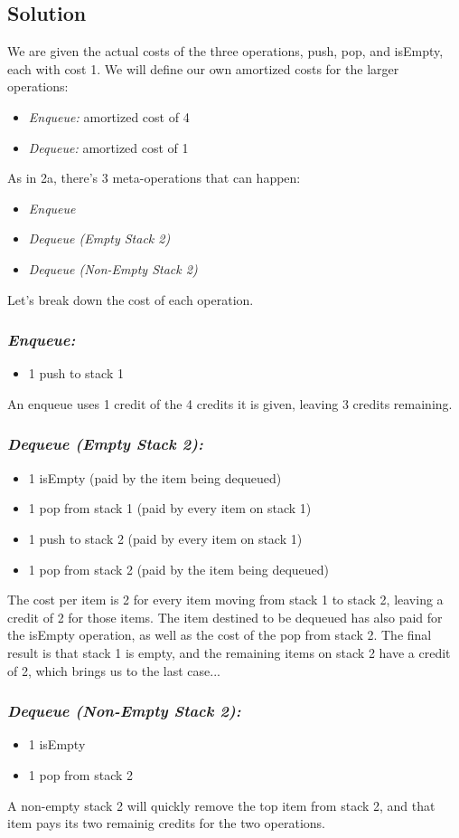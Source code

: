 \subsection*{Solution}

We are given the actual costs of the three operations, push, pop, and isEmpty, each with cost 1. We will define our own amortized costs for the larger operations: 
\begin{itemize}
\item {\em Enqueue:} amortized cost of 4
\item {\em Dequeue:} amortized cost of 1
\end{itemize}

As in 2a, there's 3 meta-operations that can happen:
\begin{itemize}
\item {\em Enqueue} 
\item {\em Dequeue (Empty Stack 2)} 
\item {\em Dequeue (Non-Empty Stack 2)} 
\end{itemize}

Let's break down the cost of each operation.

\subsubsection*{\em Enqueue:} 
\begin{itemize}
\item 1 push to stack 1
\end{itemize}

An enqueue uses 1 credit of the 4 credits it is given, leaving 3 credits remaining.

\subsubsection*{\em Dequeue (Empty Stack 2):}
\begin{itemize}
\item 1 isEmpty (paid by the item being dequeued)
\item 1 pop from stack 1 (paid by every item on stack 1)
\item 1 push to stack 2 (paid by every item on stack 1)
\item 1 pop from stack 2 (paid by the item being dequeued)
\end{itemize}

The cost per item is 2 for every item moving from stack 1 to stack 2, leaving a credit of 2 for those items. The item destined to be dequeued has also paid for the isEmpty operation, as well as the cost of the pop from stack 2. The final result is that stack 1 is empty, and the remaining items on stack 2 have a credit of 2, which brings us to the last case...

\subsubsection*{\em Dequeue (Non-Empty Stack 2):}
\begin{itemize}
\item 1 isEmpty 
\item 1 pop from stack 2
\end{itemize}

A non-empty stack 2 will quickly remove the top item from stack 2, and that item pays its two remainig credits for the two operations.

